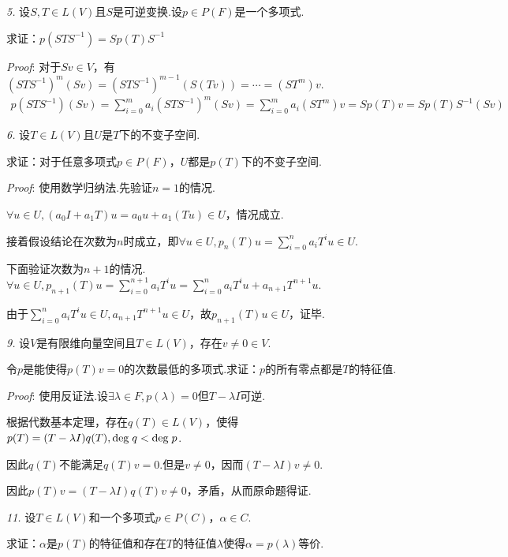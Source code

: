 \textit{5.}
设\(S,T \in L(V)\)且\(S\)是可逆变换.设\(p \in P(F)\)是一个多项式.

求证：\(p(STS^{-1})=Sp(T)S^{-1}\)

\textit{Proof}:
对于\(Sv \in V\)，有\((STS^{-1})^m (Sv)=(STS^{-1})^{m-1}(S(Tv))=\cdots=(ST^m)v\).
    \begin{align*}
        p(STS^{-1})(Sv)=\sum_{i=0}^m a_i(STS^{-1})^m (Sv) 
        =\sum_{i=0}^m a_i(ST^m)v=Sp(T)v=Sp(T)S^{-1}(Sv)
    \end{align*}

\newpage

\textit{6.}
设\(T \in L(V)\)且\(U\)是\(T\)下的不变子空间.

求证：对于任意多项式\(p \in P(F)\)，\(U\)都是\(p(T)\)下的不变子空间.

\textit{Proof}:
使用数学归纳法.先验证\(n=1\)的情况.

\(\forall u \in U,(a_0I+a_1T)u=a_0u+a_1(Tu) \in U\)，情况成立.

接着假设结论在次数为\(n\)时成立，即\(\forall u \in U,p_n(T)u=\sum_{i=0}^n a_iT^iu \in U\).

下面验证次数为\(n+1\)的情况.
\(\forall u \in U,p_{n+1}(T)u=\sum_{i=0}^{n+1} a_iT^iu=\sum_{i=0}^n a_iT^iu+a_{n+1}T^{n+1}u\).

由于\(\sum_{i=0}^n a_iT^iu \in U,a_{n+1}T^{n+1}u \in U\)，故\(p_{n+1}(T)u \in U\)，证毕.

\hspace*{\fill}

\textit{9.}
设\(V\)是有限维向量空间且\(T \in L(V)\)，存在\(v \ne 0 \in V\).

令\(p\)是能使得\(p(T)v=0\)的次数最低的多项式.求证：\(p\)的所有零点都是\(T\)的特征值.

\textit{Proof}:
使用反证法.设\(\exists \lambda \in F,p(\lambda)=0\)但\(T-\lambda I\)可逆.

根据代数基本定理，存在\(q(T) \in L(V)\)，使得\(p(T)=(T-\lambda I)q(T),\mathrm{deg \;} q<\mathrm{deg \;} p\).

因此\(q(T)\)不能满足\(q(T)v=0\).但是\(v \ne 0\)，因而\((T-\lambda I)v \ne 0\).

因此\(p(T)v=(T-\lambda I)q(T)v \ne 0\)，矛盾，从而原命题得证.

\hspace*{\fill}

\textit{11.}
设\(T \in L(V)\)和一个多项式\(p \in P(C)\)，\(\alpha \in C\).

求证：\(\alpha\)是\(p(T)\)的特征值和存在\(T\)的特征值\(\lambda\)使得\(\alpha=p(\lambda)\)等价.

